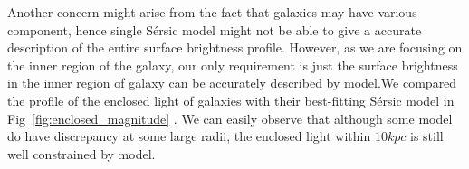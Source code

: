 \documentclass[fleqn,usenatbib]{mnras}
\begin{document}
\par Another concern might arise from the fact that galaxies may have various component, hence single S\'{e}rsic model might not be able to give a accurate description of the entire surface brightness profile. However, as we are focusing on the inner region of the galaxy, our only requirement is just the surface brightness in the inner region of galaxy can be accurately described by model.We compared the profile of the enclosed light of galaxies with their best-fitting S\'{e}rsic model in Fig~\ref{fig:enclosed_magnitude} . We can easily observe that although some model do have discrepancy at some large radii, the enclosed light within $10kpc$ is still well constrained by model. 
 
\end{document}
